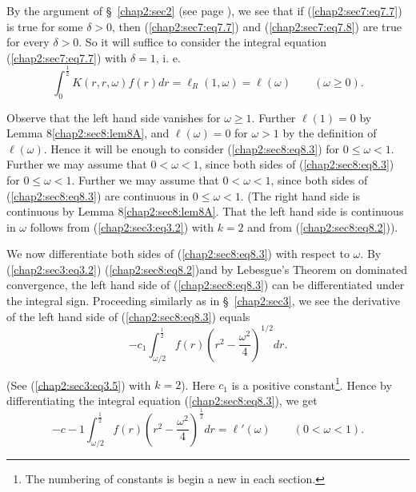 By the argument of \S\ \ref{chap2:sec2} (see page \pageref{64}), we see that if (\ref{chap2:sec7:eq7.7}) is true for some $\delta > 0$, then (\ref{chap2:sec7:eq7.7}) and (\ref{chap2:sec7:eq7.8}) are true for every $\delta > 0$. So it will suffice to consider the integral equation (\ref{chap2:sec7:eq7.7}) with $\delta = 1$, i. e. 
\begin{equation*}
\int_{0}^{\frac{1}{2}} K(r, r, \omega) f(r) dr = \ell_{R} (1, \omega) = \ell(\omega) \qquad (\omega \geq 0).\tag{8.3}\label{chap2:sec8:eq8.3}
\end{equation*}

Observe that the left hand side vanishes for $\omega \geq 1$. Further $\ell (1) = 0$ by Lemma 8\ref{chap2:sec8:lem8A}, and $\ell (\omega) = 0$ for $\omega > 1$ by the definition of $\ell (\omega)$. Hence it will be enough to consider (\ref{chap2:sec8:eq8.3}) for $0 \leq \omega < 1$. Further we may assume that $0 < \omega < 1$, since both sides of (\ref{chap2:sec8:eq8.3}) for $0 \leq \omega < 1$. Further we may assume that $0 < \omega < 1$, since both sides of (\ref{chap2:sec8:eq8.3}) are continuous in $0 \leq \omega < 1$. (The right hand side is continuous by Lemma 8\ref{chap2:sec8:lem8A}. That the left hand side is continuous in $\omega$ follows from (\ref{chap2:sec3:eq3.2}) with $k=2$ and from (\ref{chap2:sec8:eq8.2})).

We now differentiate both sides of (\ref{chap2:sec8:eq8.3}) with respect to $\omega$. By (\ref{chap2:sec3:eq3.2}) (\ref{chap2:sec8:eq8.2})\pageoriginale and by Lebesgue's Theorem on dominated convergence, the left hand side of (\ref{chap2:sec8:eq8.3}) can be differentiated under the integral sign. Proceeding similarly as in \S\ \ref{chap2:sec3}, we see the derivative of the left hand side of (\ref{chap2:sec8:eq8.3}) equals
\begin{equation*}
-c_{1} \int_{\omega/2}^{\frac{1}{2}} f(r) (r^{2} - \frac{\omega^{2}}{4})^{1/2} dr.
\end{equation*}

(See (\ref{chap2:sec3:eq3.5}) with $k = 2$). Here $c_{1}$ is a positive constant\footnote{The numbering of constants is begin a new in each section.}. Hence by differentiating the integral equation (\ref{chap2:sec8:eq8.3}), we get
\begin{equation*}
-c-{1} \int_{\omega/2}^{\frac{1}{2}} f(r) (r^{2} - \frac{\omega^{2}}{4})^{\frac{1}{2}} dr = \ell'(\omega) \qquad (0 < \omega < 1).\tag{8.4}\label{chap2:sec8:eq8.4}
\end{equation*}

